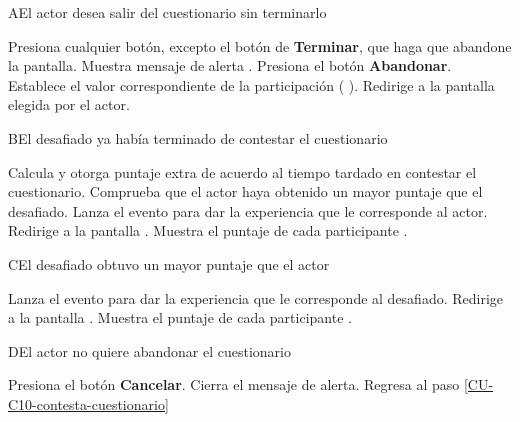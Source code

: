 \begin{UCtrayectoriaA}%
  {A}{El actor desea salir del cuestionario sin terminarlo}

  \Actor Presiona cualquier botón, excepto el botón de {\bf Terminar}, que haga que abandone la pantalla.
  \Sistema Muestra mensaje de alerta .
  \Actor Presiona el botón {\bf Abandonar}. 
  \Sistema Establece el valor correspondiente de la participación  (
  ).
  \Sistema Redirige a la pantalla elegida por el actor.

\end{UCtrayectoriaA}

\begin{UCtrayectoriaA}%
  {B}{El  desafiado ya había terminado de contestar el cuestionario}

  \Sistema Calcula y otorga puntaje extra de acuerdo al tiempo tardado en contestar el cuestionario.
  \Sistema Comprueba que el actor haya obtenido un mayor puntaje que el  desafiado. 
  \Sistema Lanza el evento para dar la experiencia que le corresponde al actor.
  \Sistema Redirige a la pantalla .
  \Sistema Muestra el puntaje de cada participante .

\end{UCtrayectoriaA}

\begin{UCtrayectoriaA}%
  {C}{El  desafiado obtuvo un mayor puntaje que el actor}

  \Sistema Lanza el evento para dar la experiencia que le corresponde al  desafiado.
  \Sistema Redirige a la pantalla .
  \Sistema Muestra el puntaje de cada participante .

\end{UCtrayectoriaA}

\begin{UCtrayectoriaA}{D}{El actor no quiere abandonar el cuestionario}

  \Actor Presiona el botón {\bf Cancelar}.
  \Sistema Cierra el mensaje de alerta.
  \Sistema Regresa al paso \ref{CU-C10-contesta-cuestionario}

\end{UCtrayectoriaA}
